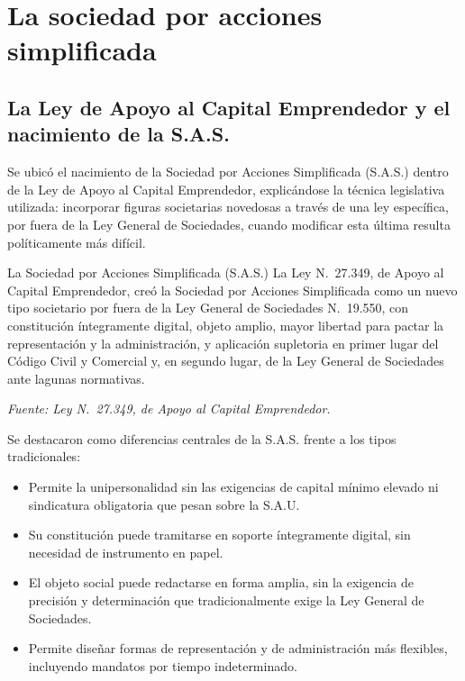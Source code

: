 \documentclass[12pt,oneside]{book}
\begin{document}
\chapter[La sociedad por acciones simplificada]{La sociedad por acciones simplificada}

\section{La Ley de Apoyo al Capital Emprendedor y el nacimiento de la S.A.S.}

Se ubicó el nacimiento de la Sociedad por Acciones Simplificada (S.A.S.) dentro de la Ley de Apoyo al Capital Emprendedor, explicándose la técnica legislativa utilizada: incorporar figuras societarias novedosas a través de una ley específica, por fuera de la Ley General de Sociedades, cuando modificar esta última resulta políticamente más difícil.

\begin{definition}{La Sociedad por Acciones Simplificada (S.A.S.)}
La Ley N.\textordmasculine~27.349, de Apoyo al Capital Emprendedor, creó la Sociedad por Acciones Simplificada como un nuevo tipo societario por fuera de la Ley General de Sociedades N.\textordmasculine~19.550, con constitución íntegramente digital, objeto amplio, mayor libertad para pactar la representación y la administración, y aplicación supletoria en primer lugar del Código Civil y Comercial y, en segundo lugar, de la Ley General de Sociedades ante lagunas normativas.

\textit{Fuente: Ley N.\textordmasculine~27.349, de Apoyo al Capital Emprendedor.}
\end{definition}

Se destacaron como diferencias centrales de la S.A.S. frente a los tipos tradicionales:

\begin{itemize}
    \item Permite la unipersonalidad sin las exigencias de capital mínimo elevado ni sindicatura obligatoria que pesan sobre la S.A.U.
    \item Su constitución puede tramitarse en soporte íntegramente digital, sin necesidad de instrumento en papel.
    \item El objeto social puede redactarse en forma amplia, sin la exigencia de precisión y determinación que tradicionalmente exige la Ley General de Sociedades.
    \item Permite diseñar formas de representación y de administración más flexibles, incluyendo mandatos por tiempo indeterminado.
\end{itemize}
\end{document}
